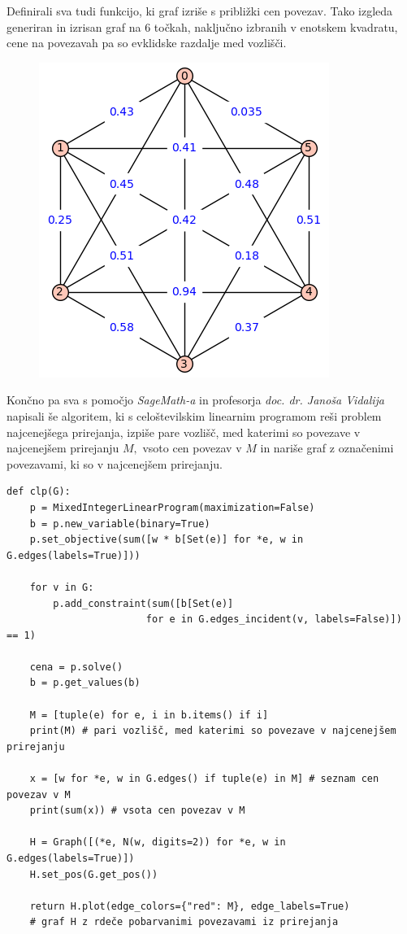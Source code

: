 \documentclass[a4paper, 11pt]{article}
\begin{document}
Definirali sva tudi funkcijo, ki graf izriše s približki cen povezav.
Tako izgleda generiran in izrisan graf na $6$ točkah, naključno izbranih v enotskem kvadratu, cene na povezavah pa so evklidske razdalje med vozlišči.
\begin{figure}[h!]
    \includegraphics[scale=0.5]{graf1}
    \centering
\end{figure}

Končno pa sva s pomočjo \emph{SageMath-a} in profesorja \emph{doc. dr. Janoša Vidalija} napisali še algoritem, ki s celoštevilskim linearnim programom
reši problem najcenejšega prirejanja, izpiše pare vozlišč, med katerimi so povezave v najcenejšem prirejanju $M,$ vsoto cen povezav v $M$ in nariše graf 
z označenimi povezavami, ki so v najcenejšem prirejanju.

\begin{verbatim}
def clp(G):
    p = MixedIntegerLinearProgram(maximization=False)
    b = p.new_variable(binary=True)
    p.set_objective(sum([w * b[Set(e)] for *e, w in G.edges(labels=True)]))

    for v in G:
        p.add_constraint(sum([b[Set(e)] 
                        for e in G.edges_incident(v, labels=False)]) == 1)

    cena = p.solve()
    b = p.get_values(b)

    M = [tuple(e) for e, i in b.items() if i]
    print(M) # pari vozlišč, med katerimi so povezave v najcenejšem prirejanju

    x = [w for *e, w in G.edges() if tuple(e) in M] # seznam cen povezav v M
    print(sum(x)) # vsota cen povezav v M

    H = Graph([(*e, N(w, digits=2)) for *e, w in G.edges(labels=True)])
    H.set_pos(G.get_pos())

    return H.plot(edge_colors={"red": M}, edge_labels=True) 
    # graf H z rdeče pobarvanimi povezavami iz prirejanja
\end{verbatim}
\end{document}
